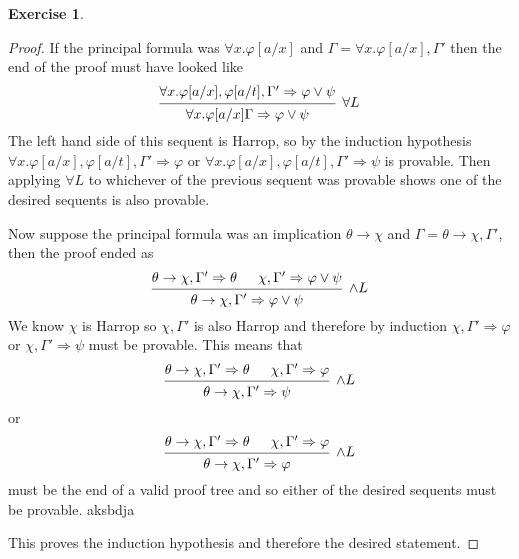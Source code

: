 \documentclass{article}
\newcommand{\sequent}[2]{#1\Rightarrow#2}
\theoremstyle{definition}
\newtheorem{question}{Exercise}
\begin{document}
\begin{question}
\begin{proof}
        If the principal formula was \(\forall x.\varphi[a/x]\) and
        \(\Gamma=\forall x.\varphi[a/x],\Gamma'\) then the end of the proof must
        have looked like
        \[
            \begin{prooftree}
                \hypo{\sequent{\forall x.\varphi[a/x],\varphi[a/t],\Gamma'}{\varphi\vee\psi}}
                \infer1[\(\forall L\)]{\sequent{\forall x.\varphi[a/x]\Gamma}{\varphi\vee\psi}}
            \end{prooftree}
        \]
        The left hand side of this sequent is Harrop, so by the induction
        hypothesis \(\sequent{\forall
            x.\varphi[a/x],\varphi[a/t],\Gamma'}{\varphi}\) or \(\sequent{\forall
            x.\varphi[a/x],\varphi[a/t],\Gamma'}{\psi}\) is provable. Then applying
        \(\forall L\) to whichever of the previous sequent was provable shows
        one of the desired sequents is also provable.

        Now suppose the principal formula was an implication \(\theta\to\chi\)
        and \(\Gamma=\theta\to\chi,\Gamma'\), then the proof ended as
        \[
            \begin{prooftree}
                \hypo{\sequent{\theta\to\chi,\Gamma'}{\theta}}
                \hypo{\sequent{\chi,\Gamma'}{\varphi\vee\psi}}
                \infer2[\(\wedge L\)]{\sequent{\theta\to\chi,\Gamma'}{\varphi\vee\psi}}
            \end{prooftree}
        \]
        We know \(\chi\) is Harrop so \(\chi,\Gamma'\) is also Harrop
        and therefore by induction \(\sequent{\chi,\Gamma'}{\varphi}\)
        or \(\sequent{\chi,\Gamma'}{\psi}\) must be provable. This means that
        \[
            \begin{prooftree}
                \hypo{\sequent{\theta\to\chi,\Gamma'}{\theta}}
                \hypo{\sequent{\chi,\Gamma'}{\varphi}}
                \infer2[\(\wedge L\)]{\sequent{\theta\to\chi,\Gamma'}{\psi}}
            \end{prooftree}
        \]
        or
        \[
            \begin{prooftree}
                \hypo{\sequent{\theta\to\chi,\Gamma'}{\theta}}
                \hypo{\sequent{\chi,\Gamma'}{\varphi}}
                \infer2[\(\wedge L\)]{\sequent{\theta\to\chi,\Gamma'}{\varphi}}
            \end{prooftree}
        \]
        must be the end of a valid proof tree and so either of the desired
        sequents must be provable. aksbdja

        This proves the induction hypothesis and therefore the desired
        statement.
    \end{proof}
\end{question}
\end{document}
